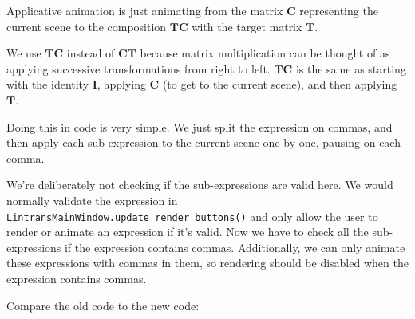 \documentclass[../development.tex]{subfiles}
\begin{document}
Applicative animation is just animating from the matrix $\mathbf{C}$ representing the current scene to the composition $\mathbf{TC}$ with the target matrix $\mathbf{T}$.

We use $\mathbf{TC}$ instead of $\mathbf{CT}$ because matrix multiplication can be thought of as applying successive transformations from right to left. $\mathbf{TC}$ is the same as starting with the identity $\mathbf{I}$, applying $\mathbf{C}$ (to get to the current scene), and then applying $\mathbf{T}$.

Doing this in code is very simple. We just split the expression on commas, and then apply each sub-expression to the current scene one by one, pausing on each comma.


We're deliberately not checking if the sub-expressions are valid here. We would normally validate the expression in \texttt{LintransMainWindow.update_render_buttons()} and only allow the user to render or animate an expression if it's valid. Now we have to check all the sub-expressions if the expression contains commas. Additionally, we can only animate these expressions with commas in them, so rendering should be disabled when the expression contains commas.

Compare the old code to the new code:


\end{document}
